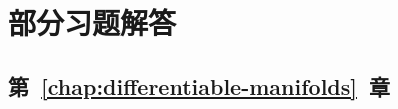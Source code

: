 \chapter{部分习题解答}\label{chap:selected-solutions}\label{chap:solutions}
\section{\texorpdfstring{第~\ref{chap:differentiable-manifolds}~章}{可微流形}}\label{sec:solutions-differentiable-manifolds}
